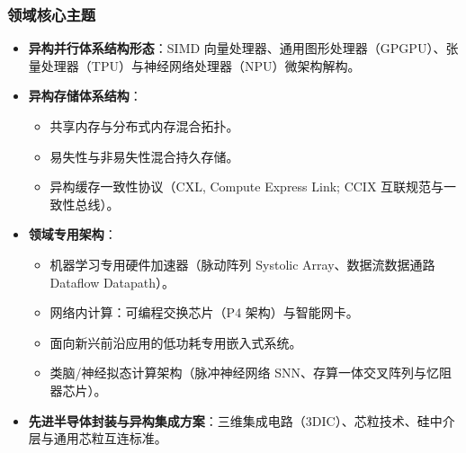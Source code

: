 \subsubsection{领域核心主题}
\begin{itemize}
    \item \textbf{异构并行体系结构形态}：SIMD 向量处理器、通用图形处理器（GPGPU）、张量处理器（TPU）与神经网络处理器（NPU）微架构解构。
    \item \textbf{异构存储体系结构}：
    \begin{itemize}
        \item 共享内存与分布式内存混合拓扑。
        \item 易失性与非易失性混合持久存储。
        \item 异构缓存一致性协议（CXL, Compute Express Link; CCIX 互联规范与一致性总线）。
    \end{itemize}
    \item \textbf{领域专用架构}：
    \begin{itemize}
        \item 机器学习专用硬件加速器（脉动阵列 Systolic Array、数据流数据通路 Dataflow Datapath）。
        \item 网络内计算：可编程交换芯片（P4 架构）与智能网卡。
        \item 面向新兴前沿应用的低功耗专用嵌入式系统。
        \item 类脑/神经拟态计算架构（脉冲神经网络 SNN、存算一体交叉阵列与忆阻器芯片）。
    \end{itemize}
    \item \textbf{先进半导体封装与异构集成方案}：三维集成电路（3DIC）、芯粒技术、硅中介层与通用芯粒互连标准。
\end{itemize}

